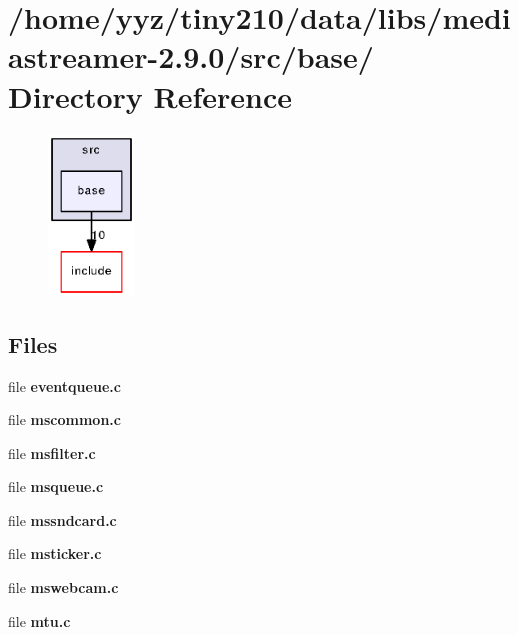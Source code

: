 \section{/home/yyz/tiny210/data/libs/mediastreamer-\/2.9.0/src/base/ Directory Reference}
\label{dir_87da357c54ab8ee420e69b496eb5b5a1}


\nopagebreak
\begin{figure}[H]
\begin{center}
\leavevmode
\includegraphics[width=65pt]{dir_87da357c54ab8ee420e69b496eb5b5a1_dep}
\end{center}
\end{figure}
\subsection*{Files}
\begin{DoxyCompactItemize}
\item 
file {\bfseries eventqueue.c}
\item 
file {\bfseries mscommon.c}
\item 
file {\bfseries msfilter.c}
\item 
file {\bfseries msqueue.c}
\item 
file {\bfseries mssndcard.c}
\item 
file {\bfseries msticker.c}
\item 
file {\bfseries mswebcam.c}
\item 
file {\bfseries mtu.c}
\end{DoxyCompactItemize}
